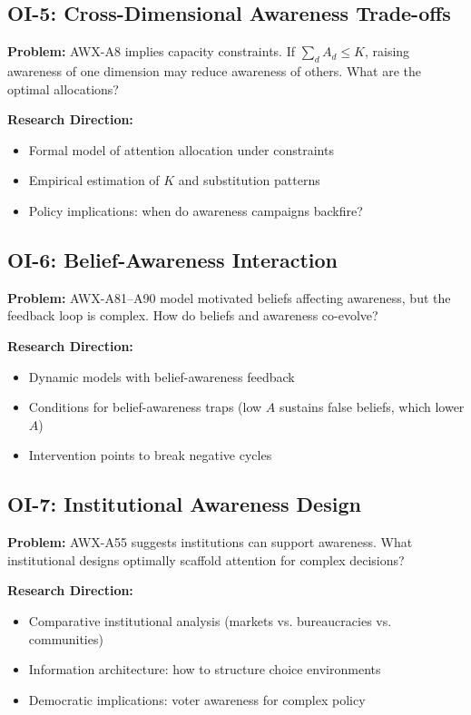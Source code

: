 \subsection{OI-5: Cross-Dimensional Awareness Trade-offs}

\textbf{Problem:} AWX-A8 implies capacity constraints. If $\sum_d A_d \leq K$, raising awareness of one dimension may reduce awareness of others. What are the optimal allocations?

\textbf{Research Direction:}
\begin{itemize}[nosep]
    \item Formal model of attention allocation under constraints
    \item Empirical estimation of $K$ and substitution patterns
    \item Policy implications: when do awareness campaigns backfire?
\end{itemize}

\subsection{OI-6: Belief-Awareness Interaction}

\textbf{Problem:} AWX-A81--A90 model motivated beliefs affecting awareness, but the feedback loop is complex. How do beliefs and awareness co-evolve?

\textbf{Research Direction:}
\begin{itemize}[nosep]
    \item Dynamic models with belief-awareness feedback
    \item Conditions for belief-awareness traps (low $A$ sustains false beliefs, which lower $A$)
    \item Intervention points to break negative cycles
\end{itemize}

\subsection{OI-7: Institutional Awareness Design}

\textbf{Problem:} AWX-A55 suggests institutions can support awareness. What institutional designs optimally scaffold attention for complex decisions?

\textbf{Research Direction:}
\begin{itemize}[nosep]
    \item Comparative institutional analysis (markets vs. bureaucracies vs. communities)
    \item Information architecture: how to structure choice environments
    \item Democratic implications: voter awareness for complex policy
\end{itemize}

